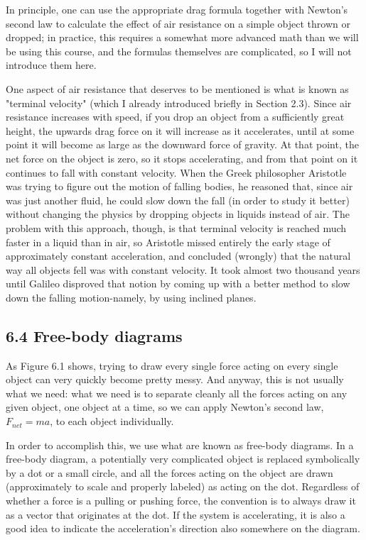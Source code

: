 \documentclass[10pt]{article}
\begin{document}
In principle, one can use the appropriate drag formula together with Newton's second law to calculate the effect of air resistance on a simple object thrown or dropped; in practice, this requires a somewhat more advanced math than we will be using this course, and the formulas themselves are complicated, so I will not introduce them here.

One aspect of air resistance that deserves to be mentioned is what is known as "terminal velocity" (which I already introduced briefly in Section 2.3). Since air resistance increases with speed, if you drop an object from a sufficiently great height, the upwards drag force on it will increase as it accelerates, until at some point it will become as large as the downward force of gravity. At that point, the net force on the object is zero, so it stops accelerating, and from that point on it continues to fall with constant velocity. When the Greek philosopher Aristotle was trying to figure out the motion of falling bodies, he reasoned that, since air was just another fluid, he could slow down the fall (in order to study it better) without changing the physics by dropping objects in liquids instead of air. The problem with this approach, though, is that terminal velocity is reached much faster in a liquid than in air, so Aristotle missed entirely the early stage of approximately constant acceleration, and concluded (wrongly) that the natural way all objects fell was with constant velocity. It took almost two thousand years until Galileo disproved that notion by coming up with a better method to slow down the falling motion-namely, by using inclined planes.

\subsection*{6.4 Free-body diagrams}
As Figure 6.1 shows, trying to draw every single force acting on every single object can very quickly become pretty messy. And anyway, this is not usually what we need: what we need is to separate cleanly all the forces acting on any given object, one object at a time, so we can apply Newton's second law, $F_{n e t}=m a$, to each object individually.

In order to accomplish this, we use what are known as free-body diagrams. In a free-body diagram, a potentially very complicated object is replaced symbolically by a dot or a small circle, and all the forces acting on the object are drawn (approximately to scale and properly labeled) as acting on the dot. Regardless of whether a force is a pulling or pushing force, the convention is to always draw it as a vector that originates at the dot. If the system is accelerating, it is also a good idea to indicate the acceleration's direction also somewhere on the diagram.
\end{document}
